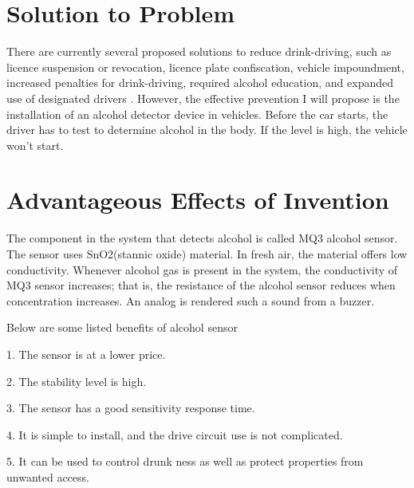 \documentclass[12pt]{article}
\begin{document}
%
%



\section{Solution to Problem}
There are currently several proposed solutions to reduce drink-driving, such as licence suspension or revocation, licence plate confiscation, vehicle impoundment, increased penalties for drink-driving,
required alcohol education, and expanded use of designated drivers \cite{a5}. However, the effective prevention I will propose is the installation of an alcohol detector device in vehicles. Before the car starts, the driver has to test to determine alcohol in the body. If the level is high, the vehicle won't start.
%
%



\section{Advantageous Effects of Invention}
The component in the system that detects alcohol is called MQ3 alcohol sensor. The sensor uses SnO2(stannic oxide) material. In fresh air, the material offers low conductivity.
Whenever alcohol gas is present in the system, the conductivity of MQ3 sensor increases; that is, the resistance of the alcohol sensor reduces when concentration increases. An analog is rendered such a sound from a buzzer.

Below are some listed benefits of alcohol sensor

   1. The sensor is at a lower price.

   2. The stability level is high.
   
   3. The sensor has a good sensitivity response time.
   
   4. It is simple to install, and the drive circuit use is not complicated.
   
   5. It can be used to control drunk ness as well as protect properties from unwanted access.
\end{document}
